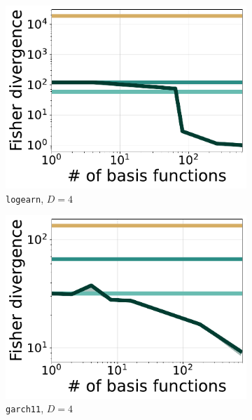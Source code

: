\begin{figure}[t]
\begin{subfigure}[b]{0.245\linewidth}
        \includegraphics[scale=0.21]{figs/expts-pdb/PDB_05_scores_noflow.pdf}
    \caption{\texttt{logearn}, $D=4$}
    \end{subfigure}
    \begin{subfigure}[b]{0.245\linewidth}
        \centering
        \includegraphics[scale=0.21]{figs/expts-pdb/PDB_99_scores_noflow.pdf}
        \caption{\texttt{garch11}, $D=4$}
    \end{subfigure}
    \begin{subfigure}[b]{0.245\linewidth}
        \centering

\end{subfigure}
\end{figure}
